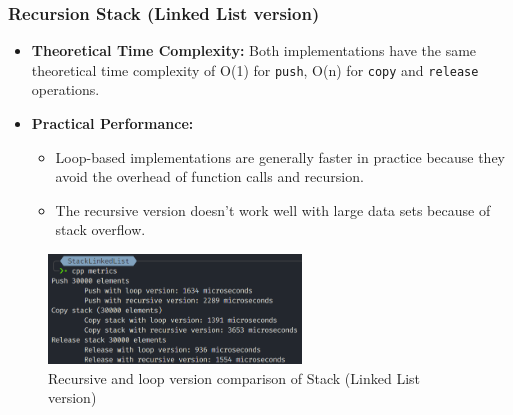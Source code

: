 \subsubsection*{Recursion Stack (Linked List version)}
\begin{itemize}
	\item \textbf{Theoretical Time Complexity:} Both implementations have the same theoretical time complexity of O(1) for \verb|push|, O(n) for \verb|copy| and \verb|release| operations.
	\item \textbf{Practical Performance:}
	      \begin{itemize}
		      \item  Loop-based implementations are generally faster in practice because they avoid the overhead of function calls and recursion.
		      \item The recursive version doesn't work well with large data sets because of stack overflow.
	      \end{itemize}
\end{itemize}
\begin{figure}[!ht]
	\centering
	\includegraphics[width=0.6\textwidth]{imgs/StackLinkedList/metrics.png}
	\caption{Recursive and loop version comparison of Stack (Linked List version)}\label{fig:stack_ll_metrics}
\end{figure}